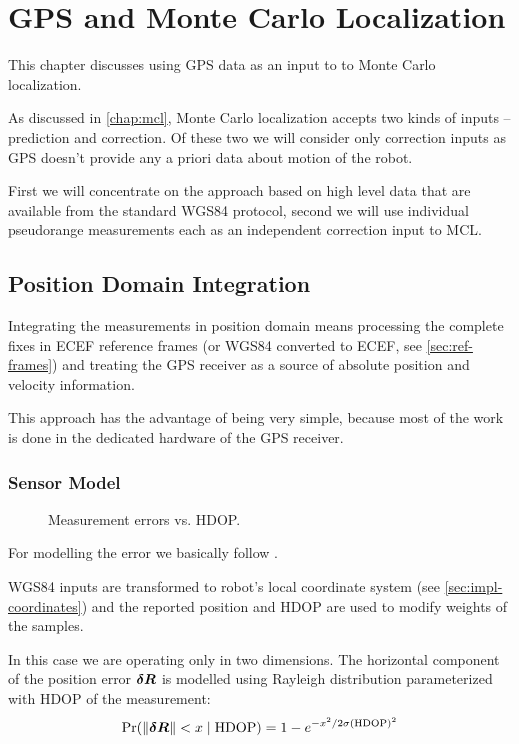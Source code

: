 \chapter{GPS and Monte Carlo Localization}
\label{chap:gps-and-mcl}

This chapter discusses using GPS data as an input to to Monte Carlo localization.

As discussed in \cref{chap:mcl}, Monte Carlo localization accepts two kinds of
inputs -- prediction and correction.
Of these two we will consider only correction inputs as GPS doesn't provide any
a priori data about motion of the robot.

First we will concentrate on the approach based on high level data that are available
from the standard WGS84 protocol,
second we will use individual pseudorange measurements each as an independent
correction input to MCL.

\section{Position Domain Integration}
Integrating the measurements in position domain means processing the complete
fixes in ECEF reference frames (or WGS84 converted to ECEF, see \cref{sec:ref-frames})
and treating the GPS receiver as a source of absolute position and velocity information.

This approach has the advantage of being very simple, because most of the work
is done in the dedicated hardware of the GPS receiver.

\subsection{Sensor Model}
\label{sec:wgs84-hdop-error}

\begin{figure}[htp]
	\centering
	\noindent{}
	\caption{Measurement errors vs. HDOP.}
	\label{fig:wgs84-hdop-error}
\end{figure}

For modelling the error we basically follow \cite{www-wilson}.

WGS84 inputs are transformed to robot's local coordinate system (see
\cref{sec:impl-coordinates}) and the reported position and HDOP are used
to modify weights of the samples.

In this case we are operating only in two dimensions.
The horizontal component of the position error  \(\bm{\delta R}\) is modelled using Rayleigh distribution
parameterized with HDOP of the measurement:
\begin{equation}
	\operatorname{\mathrm{Pr}}(\lVert\bm{\delta R}\rVert < x \mid \mathrm{HDOP}) =
		1 - e^{-x^2/2\sigma(\mathrm{HDOP})^2}
\end{equation}

